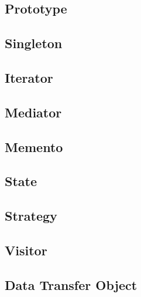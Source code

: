
\subsection{Prototype}


\subsection{Singleton}


\subsection{Iterator}


\subsection{Mediator}


\subsection{Memento}


\subsection{State}


\subsection{Strategy}


\subsection{Visitor}


\subsection{Data Transfer Object}

